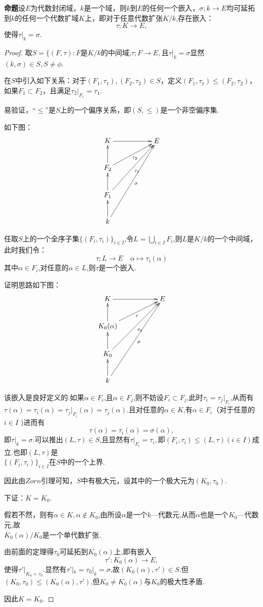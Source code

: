 \documentclass[UTF8]{article}
\begin{document}
\textbf{命题}\quad  设$E$为代数封闭域，$k$是一个域，则$k$到$E$的任何一个嵌入，$\sigma; k\rightarrow E$均可延拓到$k$的任何一个代数扩域$K$上，即对于任意代数扩张$K/k$,存在嵌入：$$\tau ;K\rightarrow E,$$使得$\tau |_k=\sigma$.
\begin{proof}
取$S=\{(F,\tau):F$是$K/k$的中间域,$\tau ;F\rightarrow E,$且$\tau |_k=\sigma$显然$(k,\sigma)\in S,S\ne \phi $.

在$S$中引入如下关系：对于$(F_1,\tau_1),(F_2,\tau_2)\in S$，定义$(F_1,\tau_1)\le (F_2,\tau_2)$，如果$F_1\subset F_2$，且满足$\tau_2|_{F_1}=\tau_1$.

易验证，“$\le $”是$S$上的一个偏序关系，即$(S,\le)$是一个非空偏序集.

如下图：$$\xymatrix{K\ar[rr]&&{E}\\F_2 \ar[u] \ar[rru]_{\tau_2} && \\F_1 \ar[u] \ar[rruu]_{\tau_1} && \\k\ar[u] \ar[rruuu]_{\sigma} &&} $$

任取$S$上的一个全序子集$\{(F_i,\tau_i)\}_{i\in I}$,令$L=\bigcup_{i\in I}F_{i}$,则$L$是$K/k$的一个中间域，此时我们令：$$\tau ;L\rightarrow E \quad \alpha\longmapsto \tau_i(\alpha)$$其中$\alpha\in F_i$,对任意的$\alpha\in L$,则$\tau$是一个嵌入.

证明思路如下图：$$\xymatrix{K\ar[rr]&&{E}\\K_0(\alpha)\ar[u] \ar[rru]_{\tau} && \\K_0 \ar[u] \ar[rruu]_{\tau_0} && \\k\ar[u] \ar[rruuu]_{\sigma} &&} $$

该嵌入是良好定义的.如果$\alpha\in F_i$,且$\alpha\in F_j$,则不妨设$F_i\subset F_j$,此时$\tau_i=\tau_j|_{F_i}$,从而有$\tau(\alpha)=\tau_i(\alpha)=\tau_j|_{F_i}(\alpha)=\tau_j(\alpha).$且对任意的$\alpha\in K$,有$\alpha\in F_i$（对于任意的$i\in I$ )进而有$$\tau(\alpha)=\tau_i(\alpha)=\sigma(\alpha),$$即$\tau |_k=\sigma$.可以推出$(L,\tau)\in S$,且显然有$\tau |_{F_i}=\tau_i,$即$(F_i,\tau_i)\le(L,\tau)(i\in I) $成立.也即$(L,\tau)$是\\$\{(F_i,\tau_i)\}_{i\in I}$在$S$中的一个上界.

因此由$Zorn$引理可知，$S$中有极大元，设其中的一个极大元为$(K_0,\tau_0).$

下证：$K=K_0.$

假若不然，则有$\alpha\in K,\alpha\notin K_0$,由所设$\alpha$是一个$k$—代数元,从而$\alpha$也是一个$K_0$—代数元,故\\$K_0(\alpha)/K_0$是一个单代数扩张.

由前面的定理得$\tau_0$可延拓到$K_0(\alpha)$上,即有嵌入$$\tau':K_0(\alpha)\rightarrow E,$$使得$\tau'|_{K_0=\tau_0}.$显然有$\tau'|_k=\tau_0|_k=\sigma$,故$(K_0(\alpha),\tau')\in S$.但$(K_0,\tau_0)\le(K_0(\alpha),\tau')$,但$K_0\ne K_0(\alpha)$与$K_0$的极大性矛盾.

因此$K=K_0.$
\end{proof}
\end{document}
